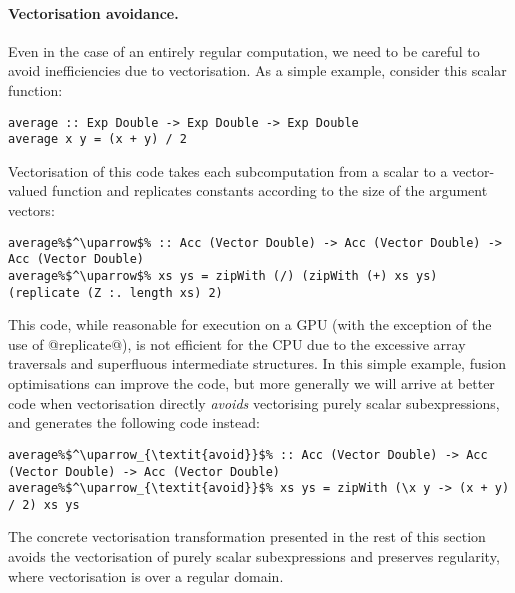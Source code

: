 \paragraph{Vectorisation avoidance.} Even in the case of an entirely regular computation, we need to be careful to avoid inefficiencies due to vectorisation. As a simple example, consider this scalar function:
%
\begin{lstlisting}
average :: Exp Double -> Exp Double -> Exp Double
average x y = (x + y) / 2
\end{lstlisting}
%
Vectorisation of this code takes each subcomputation from a scalar to a vector-valued function and replicates constants according to the size of the argument vectors:
%
\begin{lstlisting}
average%$^\uparrow$% :: Acc (Vector Double) -> Acc (Vector Double) -> Acc (Vector Double)
average%$^\uparrow$% xs ys = zipWith (/) (zipWith (+) xs ys) (replicate (Z :. length xs) 2)
\end{lstlisting}
%
This code, while reasonable for execution on a GPU (with the exception of the use of @replicate@), is not efficient for the CPU due to the excessive array traversals and superfluous intermediate structures. In this simple example, fusion optimisations can improve the code, but more generally we will arrive at better code when vectorisation directly \emph{avoids} vectorising purely scalar subexpressions, and generates the following code instead:
%
\begin{lstlisting}
average%$^\uparrow_{\textit{avoid}}$% :: Acc (Vector Double) -> Acc (Vector Double) -> Acc (Vector Double)
average%$^\uparrow_{\textit{avoid}}$% xs ys = zipWith (\x y -> (x + y) / 2) xs ys
\end{lstlisting}

The concrete vectorisation transformation presented in the rest of this section avoids the vectorisation of purely scalar subexpressions and preserves regularity, where vectorisation is over a regular domain.




